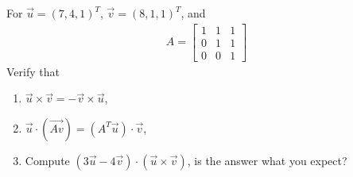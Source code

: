 \begin{Exercise}
\label{ex:ch4prob_coplanar}
For $\vec{u} = (7, 4, 1)^T$, $\vec{v} = (8, 1, 1)^T$, and
\begin{align*}
A = 
\begin{bmatrix}
1 & 1 & 1\\
0 & 1 & 1\\
0 & 0 & 1
\end{bmatrix}
\end{align*}
Verify that
\begin{enumerate}[label=(\alph*)]
\item $\vec{u} \times \vec{v} = -\vec{v} \times \vec{u}$, 
\item $\vec{u} \cdot (\vec{Av}) = (A^T\vec{u}) \cdot \vec{v}$, 
\item Compute $(3\vec{u} - 4\vec{v}) \cdot (\vec{u} \times \vec{v})$, is the answer what you expect?
\end{enumerate}
\end{Exercise}
